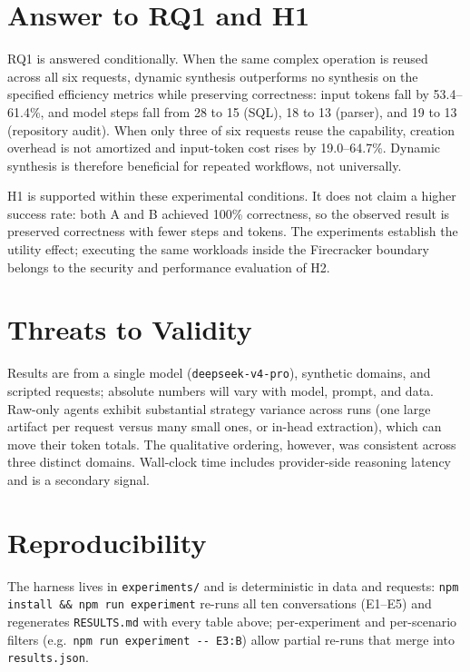 \section{Answer to RQ1 and H1}
RQ1 is answered conditionally. When the same complex operation is reused across all
six requests, dynamic synthesis outperforms no synthesis on the specified efficiency
metrics while preserving correctness: input tokens fall by 53.4--61.4\%, and model
steps fall from 28 to 15 (SQL), 18 to 13 (parser), and 19 to 13 (repository audit).
When only three of six requests reuse the capability, creation overhead is not
amortized and input-token cost rises by 19.0--64.7\%. Dynamic synthesis is therefore
beneficial for repeated workflows, not universally.

H1 is supported within these experimental conditions. It does not claim a higher
success rate: both A and B achieved 100\% correctness, so the observed result is
preserved correctness with fewer steps and tokens. The experiments establish the
utility effect; executing the same workloads inside the Firecracker boundary belongs
to the security and performance evaluation of H2.

\section{Threats to Validity}
Results are from a single model (\texttt{deepseek-v4-pro}), synthetic domains, and
scripted requests; absolute numbers will vary with model, prompt, and data. Raw-only
agents exhibit substantial strategy variance across runs (one large artifact per
request versus many small ones, or in-head extraction), which can move their token
totals. The qualitative ordering, however, was
consistent across three distinct domains. Wall-clock time includes
provider-side reasoning latency and is a secondary signal.

\section{Reproducibility}
The harness lives in \texttt{experiments/} and is deterministic in data and requests:
\texttt{npm install \&\& npm run experiment} re-runs all ten conversations (E1--E5)
and regenerates \texttt{RESULTS.md} with every table above; per-experiment and
per-scenario filters (e.g.\ \texttt{npm run experiment -{}- E3:B}) allow partial
re-runs that merge into \texttt{results.json}.
